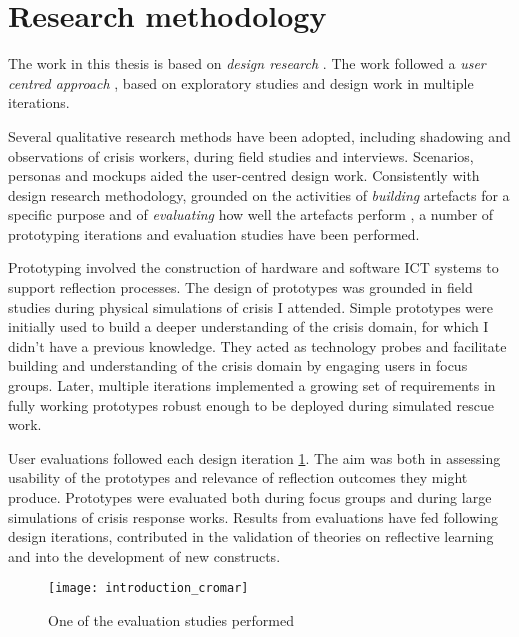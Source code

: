 \section{Research methodology}\label{research-methodology}

The work in this thesis is based on \emph{design research}
\autocites{Hevner:2010fy}{March:1995gm}. The work followed a \emph{user
centred approach} \autocites{MAGUIRE:2001dp}{Gulliksen:2003hd}, based on
exploratory studies and design work in multiple iterations.

Several qualitative research methods \autocite{robson1993real} have been
adopted, including shadowing and observations of crisis workers, during
field studies and interviews. Scenarios, personas and mockups aided the
user-centred design work. Consistently with design research methodology,
grounded on the activities of \emph{building} artefacts for a specific
purpose and of \emph{evaluating} how well the artefacts perform
\autocite{March:1995gm}, a number of prototyping iterations and
evaluation studies have been performed.

Prototyping involved the construction of hardware and software ICT
systems to support reflection processes. The design of prototypes was
grounded in field studies during physical simulations of crisis I
attended. Simple prototypes were initially used to build a deeper
understanding of the crisis domain, for which I didn't have a previous
knowledge. They acted as technology probes \autocite{Hutchinson:2003il}
and facilitate building and understanding of the crisis domain by
engaging users in focus groups. Later, multiple iterations implemented a
growing set of requirements in fully working prototypes robust enough to
be deployed during simulated rescue work.

User evaluations followed each design iteration \ref{fig:cromar}. The
aim was both in assessing usability of the prototypes and relevance of
reflection outcomes they might produce. Prototypes were evaluated both
during focus groups and during large simulations of crisis response
works. Results from evaluations have fed following design iterations,
contributed in the validation of theories on reflective learning and
into the development of new constructs.

\begin{figure}[tbh]
    \centering
    \texttt{[image: introduction\_cromar]}
    \caption{One of the evaluation studies performed}
    \label{fig:cromar}
\end{figure}

